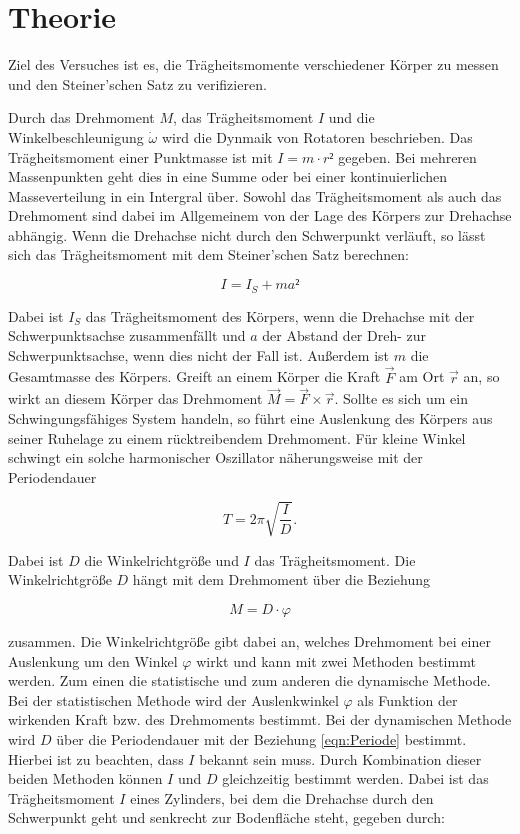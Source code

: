 \section{Theorie}
\label{sec:Theorie}

Ziel des Versuches ist es, die Trägheitsmomente verschiedener Körper 
zu messen und den Steiner'schen Satz zu verifizieren.

Durch das Drehmoment $M$, das Trägheitsmoment $I$ und die Winkelbeschleunigung 
$\dot\omega$ wird die Dynmaik von Rotatoren beschrieben. Das Trägheitsmoment
einer Punktmasse ist mit $I = m\cdot r²$ gegeben. Bei mehreren Massenpunkten
geht dies in eine Summe oder bei einer kontinuierlichen Masseverteilung 
in ein Intergral über. Sowohl das Trägheitsmoment als auch das Drehmoment 
sind dabei im Allgemeinem von der Lage des Körpers zur Drehachse abhängig. 
Wenn die Drehachse nicht durch den Schwerpunkt verläuft, so lässt sich das
Trägheitsmoment mit dem Steiner'schen Satz berechnen: 

\begin{equation}
I = I_S + ma² 
\label{Steiner}
\end{equation}

Dabei ist $I_S$ das Trägheitsmoment des Körpers, wenn die Drehachse mit der 
Schwerpunktsachse zusammenfällt und $a$ der Abstand der Dreh- zur Schwerpunktsachse, 
wenn dies nicht der Fall ist. Außerdem ist $m$ die Gesamtmasse des Körpers.
Greift an einem Körper die Kraft $\vec{F}$ am Ort $\vec{r}$ an, so wirkt 
an diesem Körper das Drehmoment $\vec{M} = \vec{F} \times \vec{r}$. Sollte es
sich um ein Schwingungsfähiges System handeln, so führt eine Auslenkung des 
Körpers aus seiner Ruhelage zu einem rücktreibendem Drehmoment. Für kleine
Winkel schwingt ein solche harmonischer Oszillator näherungsweise mit 
der Periodendauer

\begin{equation}
T = 2\pi\sqrt{\frac{I}{D}}.
\label{eqn:Periode}
\end{equation}

Dabei ist $D$ die Winkelrichtgröße und $I$ das Trägheitsmoment. Die 
Winkelrichtgröße $D$ hängt mit dem Drehmoment über die Beziehung 

\begin{equation}
M = D\cdot\varphi
\label{eqn:Winkelrichtgröße}
\end{equation}

zusammen. Die Winkelrichtgröße gibt dabei an, welches Drehmoment bei einer 
Auslenkung um den Winkel $\varphi$ wirkt und kann mit zwei Methoden bestimmt 
werden. Zum einen die statistische und zum anderen die dynamische Methode. 
Bei der statistischen Methode wird der Auslenkwinkel $\varphi$ als Funktion
der wirkenden Kraft bzw. des Drehmoments bestimmt. Bei der dynamischen 
Methode wird $D$ über die Periodendauer mit der Beziehung \eqref{eqn:Periode}
bestimmt. Hierbei ist zu beachten, dass $I$ bekannt sein muss. 
Durch Kombination dieser beiden Methoden können $I$ und $D$ gleichzeitig
bestimmt werden. 
Dabei ist das Trägheitsmoment $I$ eines Zylinders, bei dem die Drehachse
durch den Schwerpunkt geht und senkrecht zur Bodenfläche steht, gegeben 
durch: 

